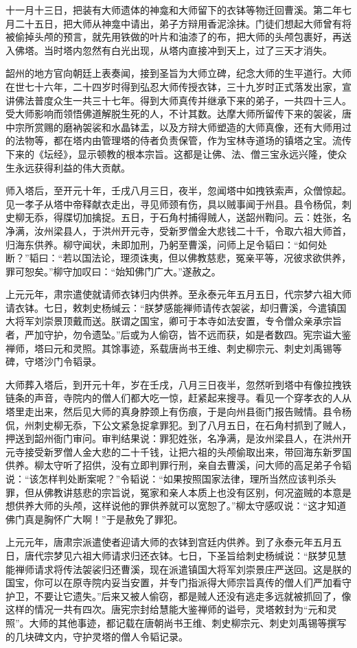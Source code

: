 \documentclass[12pt,twoside,openany]{book}
\newcommand{\kai}[1]{{\CJKfamily{kai}#1}}
\begin{document}
{十一月十三日，把装有大师遗体的神龛和大师留下的衣钵等物迁回曹溪。第二年七月二十五日，把大师从神龛中请出，弟子方辩用香泥涂抹。门徒们想起大师曾有将被偷掉头颅的预言，就先用铁做的叶片和油漆了的布，把大师的头颅包裹好，再送入佛塔。当时塔内忽然有白光出现，从塔内直接冲到天上，过了三天才消失。

韶州的地方官向朝廷上表奏闻，接到圣旨为大师立碑，纪念大师的生平道行。大师在世七十六年，二十四岁时得到弘忍大师传授衣钵，三十九岁时正式落发出家，宣讲佛法普度众生一共三十七年。得到大师真传并继承下来的弟子，一共四十三人。受大师影响而领悟佛道解脱生死的人，不计其数。达摩大师所留传下来的袈裟，唐中宗所赏赐的磨衲袈裟和水晶钵盂，以及方辩大师塑造的大师真像，还有大师用过的法物等，都在塔内由管理塔的侍者负责保管，作为宝林寺道场的镇塔之宝。流传下来的《坛经》，显示顿教的根本宗旨。这都是让佛、法、僧三宝永远兴隆，使众生永远获得利益的伟大贡献。}

师入塔后，至开元十年，壬戌八月三日，夜半，忽闻塔中如拽铁索声，众僧惊起。见一孝子从塔中帝释献衣走出，寻见师颈有伤，具以贼事闻于州县。县令杨侃，刺史柳无忝，得牒切加擒捉。五日，于石角村捕得贼人，送韶州鞫问。云：姓张，名净满，汝州梁县人，于洪州开元寺，受新罗僧金大悲钱二十千，令取六祖大师首，归海东供养。柳守闻状，未即加刑，乃躬至曹溪，问师上足令韬曰：“如何处断？”韬曰：“若以国法论，理须诛夷，但以佛教慈悲，冤亲平等，况彼求欲供养，罪可恕矣。”柳守加叹曰：“始知佛门广大。”遂赦之。

上元元年，肃宗遣使就请师衣钵归内供养。至永泰元年五月五日，代宗梦六祖大师请衣钵。七日，敕刺史杨缄云：“朕梦感能禅师请传衣袈裟，却归曹溪，今遣镇国大将军刘崇景顶戴而送。朕谓之国宝，卿可于本寺如法安置，专令僧众亲承宗旨者，严加守护，勿令遗坠。”后或为人偷窃，皆不远而获，如是者数四。宪宗谥大鉴禅师，塔曰元和灵照。其馀事迹，系载唐尚书王维、刺史柳宗元、刺史刘禹锡等碑，守塔沙门令韬录。

\kai{大师葬入塔后，到开元十年，岁在壬戌，八月三日夜半，忽然听到塔中有像拉拽铁链条的声音，寺院内的僧人们都大吃一惊，赶紧起来搜寻。看见一个穿孝衣的人从塔里走出来，然后见大师的真身脖颈上有伤痕，于是向州县衙门报告贼情。县令杨侃，州刺史柳无忝，下公文紧急捉拿罪犯。到了八月五日，在石角村抓到了贼人，押送到韶州衙门审问。审判结果说：罪犯姓张，名净满，是汝州梁县人，在洪州开元寺接受新罗僧人金大悲的二十千钱，让把六祖的头颅偷取出来，带回海东新罗国供养。柳太守听了招供，没有立即判罪行刑，亲自去曹溪，问大师的高足弟子令韬说：“该怎样判处断案呢？”令韬说：“如果按照国家法律，理所当然应该判杀头罪，但从佛教讲慈悲的宗旨说，冤家和亲人本质上也没有区别，何况盗贼的本意是想供养大师的头颅，这样说他的罪供养就可以宽恕了。”柳太守感叹说：“这才知道佛门真是胸怀广大啊！”于是赦免了罪犯。
	
上元元年，唐肃宗派遣使者迎请大师的衣钵到宫廷内供养。到了永泰元年五月五日，唐代宗梦见六祖大师请求归还衣钵。七日，下圣旨给刺史杨缄说：“朕梦见慧能禅师请求将传法袈裟归还曹溪，现在派遣镇国大将军刘崇景庄严送回。这是朕的国宝，你可以在原寺院内妥当安置，并专门指派得大师宗旨真传的僧人们严加看守护卫，不要让它遗失。”后来又被人偷窃，都是贼人还没有逃走多远就被抓回了，像这样的情况一共有四次。唐宪宗封给慧能大鉴禅师的谥号，灵塔敕封为“元和灵照”。大师的其他事迹，都记载在唐朝尚书王维、刺史柳宗元、刺史刘禹锡等撰写的几块碑文内，守护灵塔的僧人令韬记录。}
\end{document}
